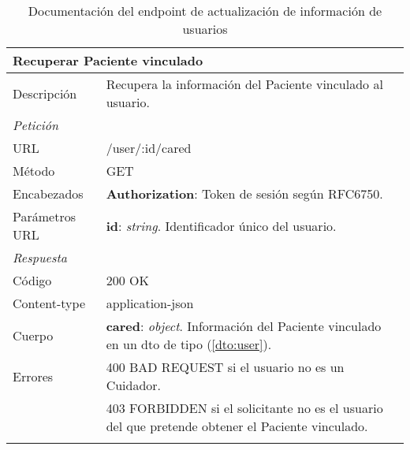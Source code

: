 \newpage
\begin{longtable}{|p{} p{}|}
    \hline
    \multicolumn{2}{|l|}{\textbf{Recuperar Paciente vinculado}} \\ \hline 
    Descripción         & Recupera la información del Paciente vinculado al usuario. \\ \hline \hline
    \multicolumn{2}{|l|}{\emph{Petición}}  \\ \hline 
    URL      & /user/:id/cared \\ \hline
    Método   & GET                  \\ \hline
    Encabezados  & 
    \textbf{Authorization}: Token de sesión según RFC6750. \\ \hline
    Parámetros URL  & 
    \textbf{id}: \emph{string}. Identificador único del usuario. \\ \hline  \hline
    \multicolumn{2}{|l|}{\emph{Respuesta}} \\ \hline 
    Código          & 200 OK         \\ \hline
    Content-type    & application-json  \\ \hline
    Cuerpo  & 
    \textbf{cared}: \emph{object}. Información del Paciente vinculado en un \acrshort{dto} de tipo \nameref{dto:user} (\ref{dto:user}). \\ \hline \hline
    Errores & 400 BAD REQUEST si el usuario no es un Cuidador. \\
            & 403 FORBIDDEN si el solicitante no es el usuario del que pretende obtener el Paciente vinculado. \\ \hline
    \caption{Documentación del endpoint de actualización de información de usuarios}
    \label{api:recuperar_paciente}
\end{longtable}

